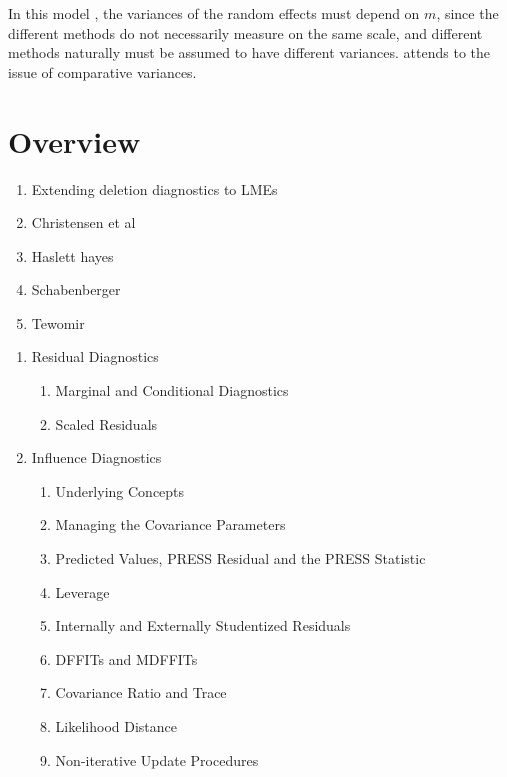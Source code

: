 \documentclass[12pt, a4paper]{report}
\theoremstyle{plain}
\theoremstyle{definition}
\theoremstyle{remark}
\begin{document}
	In this model , the variances of the random effects must depend on
	$m$, since the different methods do not necessarily measure on the
	same scale, and different methods naturally must be assumed to
	have different variances. \citet{BXC2004} attends to the issue of
	comparative variances.

	\section{Overview}
	\begin{enumerate}
		\item Extending deletion diagnostics to LMEs
		\item Christensen et al
		\item Haslett hayes
		\item Schabenberger
		\item Tewomir
	\end{enumerate}
	
	\begin{enumerate}
		\item Residual Diagnostics
		\begin{enumerate}
			\item Marginal and Conditional Diagnostics
			\item Scaled Residuals
		\end{enumerate}
		
		\item Influence Diagnostics
		\begin{enumerate}
			\item Underlying Concepts
			\item Managing the Covariance Parameters
			\item Predicted Values, PRESS Residual and the PRESS Statistic
			\item Leverage
			\item Internally and Externally Studentized Residuals
			\item DFFITs and MDFFITs
			\item Covariance Ratio and Trace
			\item Likelihood Distance
			\item Non-iterative Update Procedures
		\end{enumerate}
	\end{enumerate}
	
\end{document}
